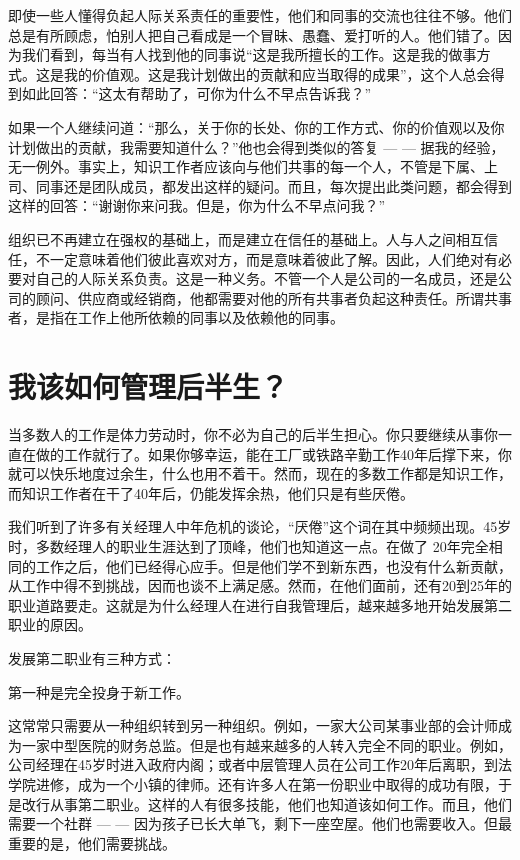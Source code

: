 \documentclass[a4paper,12pt,lang=cn,fontset = windows]{elegantpaper} %
\begin{document}
即使一些人懂得负起人际关系责任的重要性，他们和同事的交流也往往不够。他们总是有所顾虑，怕别人把自己看成是一个冒昧、愚蠢、爱打听的人。他们错了。因为我们看到，每当有人找到他的同事说“这是我所擅长的工作。这是我的做事方式。这是我的价值观。这是我计划做出的贡献和应当取得的成果”，这个人总会得到如此回答：“这太有帮助了，可你为什么不早点告诉我？”

如果一个人继续问道：“那么，关于你的长处、你的工作方式、你的价值观以及你计划做出的贡献，我需要知道什么？”他也会得到类似的答复 — — 据我的经验，无一例外。事实上，知识工作者应该向与他们共事的每一个人，不管是下属、上司、同事还是团队成员，都发出这样的疑问。而且，每次提出此类问题，都会得到这样的回答：“谢谢你来问我。但是，你为什么不早点问我？”

组织已不再建立在强权的基础上，而是建立在信任的基础上。人与人之间相互信任，不一定意味着他们彼此喜欢对方，而是意味着彼此了解。因此，人们绝对有必要对自己的人际关系负责。这是一种义务。不管一个人是公司的一名成员，还是公司的顾问、供应商或经销商，他都需要对他的所有共事者负起这种责任。所谓共事者，是指在工作上他所依赖的同事以及依赖他的同事。

\section{我该如何管理后半生？}
当多数人的工作是体力劳动时，你不必为自己的后半生担心。你只要继续从事你一直在做的工作就行了。如果你够幸运，能在工厂或铁路辛勤工作40年后撑下来，你就可以快乐地度过余生，什么也用不着干。然而，现在的多数工作都是知识工作，而知识工作者在干了40年后，仍能发挥余热，他们只是有些厌倦。

我们听到了许多有关经理人中年危机的谈论，“厌倦”这个词在其中频频出现。45岁时，多数经理人的职业生涯达到了顶峰，他们也知道这一点。在做了 20年完全相同的工作之后，他们已经得心应手。但是他们学不到新东西，也没有什么新贡献，从工作中得不到挑战，因而也谈不上满足感。然而，在他们面前，还有20到25年的职业道路要走。这就是为什么经理人在进行自我管理后，越来越多地开始发展第二职业的原因。

发展第二职业有三种方式：

第一种是完全投身于新工作。

这常常只需要从一种组织转到另一种组织。例如，一家大公司某事业部的会计师成为一家中型医院的财务总监。但是也有越来越多的人转入完全不同的职业。例如，公司经理在45岁时进入政府内阁；或者中层管理人员在公司工作20年后离职，到法学院进修，成为一个小镇的律师。还有许多人在第一份职业中取得的成功有限，于是改行从事第二职业。这样的人有很多技能，他们也知道该如何工作。而且，他们需要一个社群 — — 因为孩子已长大单飞，剩下一座空屋。他们也需要收入。但最重要的是，他们需要挑战。
\end{document}
